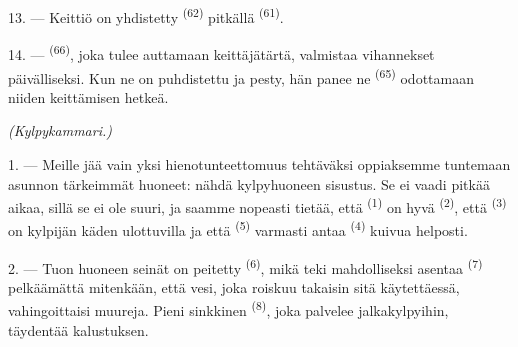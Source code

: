 13. --- Keittiö on yhdistetty  \textsuperscript{(62)}
pitkällä  \textsuperscript{(61)}.

14. ---  \textsuperscript{(66)}, joka tulee
auttamaan keittäjätärtä, valmistaa vihannekset päivälliseksi. Kun ne on
puhdistettu ja pesty, hän panee ne  \textsuperscript{(65)}
odottamaan niiden keittämisen hetkeä.

\VUsaut{4.0mm}
{\centering\fontsize{10.2pt}{10.2pt}\selectfont{} \textit{(Kylpykammari.)}\par}
\VUsaut{3.0mm}

1. --- Meille jää vain yksi hienotunteettomuus tehtäväksi oppiaksemme tuntemaan
asunnon tärkeimmät huoneet: nähdä kylpyhuoneen sisustus. Se ei vaadi pitkää
aikaa, sillä se ei ole suuri, ja saamme nopeasti tietää, että
 \textsuperscript{(1)} on hyvä 
\textsuperscript{(2)}, että  \textsuperscript{(3)} on
kylpijän käden ulottuvilla ja että 
\textsuperscript{(5)} varmasti antaa  \textsuperscript{(4)}
kuivua helposti.

2. --- Tuon huoneen seinät on peitetty 
\textsuperscript{(6)}, mikä teki mahdolliseksi asentaa 
\textsuperscript{(7)} pelkäämättä mitenkään, että vesi, joka roiskuu takaisin
sitä käytettäessä, vahingoittaisi muureja. Pieni sinkkinen 
\textsuperscript{(8)}, joka palvelee jalkakylpyihin, täydentää kalustuksen.
\VUsaut{6.0mm}
\VUfilet{22mm}
